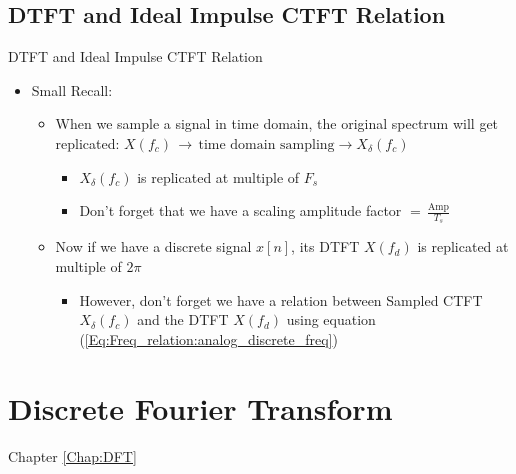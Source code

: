 \documentclass{beamer}
\begin{document}
\subsection{DTFT and Ideal Impulse CTFT Relation}
\begin{frame}[t]{DTFT and Ideal Impulse CTFT Relation}

\begin{itemize}

\item Small Recall:

	\begin{itemize}
	\item When we sample a signal in time domain, the original spectrum will get replicated: $X(f_c) \, \rightarrow \, \text{time domain sampling} \rightarrow X_{\delta}(f_c)$
	
		\begin{itemize}
		\item $X_{\delta}(f_c)$ is replicated at multiple of $F_s$ 
		\item Don't forget that we have a scaling amplitude factor $= \, \displaystyle\frac{\text{Amp}}{T_s}$
		\end{itemize}
	
	\item Now if we have a discrete signal $x[n]$, its DTFT $X(f_d)$ is replicated at multiple of $2 \pi$
	
		\begin{itemize}
		\item However, don't forget we have a relation between Sampled CTFT $X_{\delta}(f_c)$ and the DTFT $X(f_d)$ using equation (\autoref{Eq:Freq_relation:analog_discrete_freq})
			
	
	\end{itemize}

\end{itemize}

\end{itemize}

\end{frame}

\section{Discrete Fourier Transform}
\label{Chap:DFT}
\begin{frame}[t,allowframebreaks]{Chapter \autoref{Chap:DFT}}
\tableofcontents[sections= \value{section}]
\end{frame}
\end{document}
